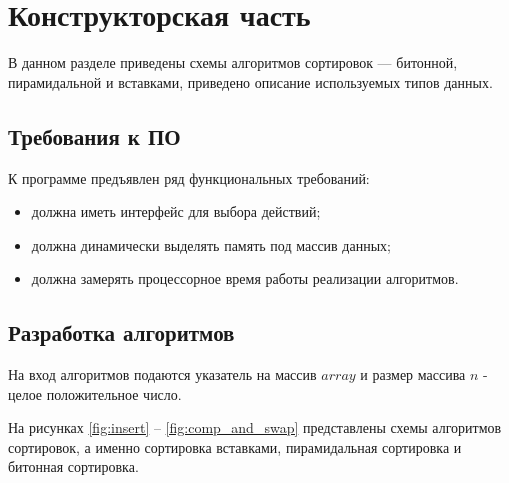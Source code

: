 \chapter{Конструкторская часть}

В данном разделе приведены схемы алгоритмов сортировок --- битонной, пирамидальной и вставками, приведено описание используемых типов данных.

\section{Требования к ПО}

К программе предъявлен ряд функциональных требований:
\begin{itemize}[label=---]
	\item должна иметь интерфейс для выбора действий;
	\item должна динамически выделять память под массив данных;
	\item должна замерять процессорное время работы реализации алгоритмов.
\end{itemize}

\section{Разработка алгоритмов}

На вход алгоритмов подаются указатель на массив $array$ и размер массива $n$ - целое положительное число.

На рисунках \ref{fig:insert} -- \ref{fig:comp_and_swap} представлены схемы алгоритмов сортировок, а именно сортировка вставками, пирамидальная сортировка и битонная сортировка.

